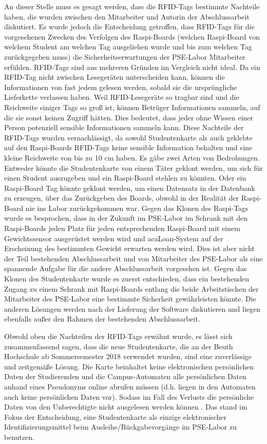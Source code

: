 An dieser Stelle muss es gesagt werden, dass die RFID-Tags bestimmte Nachteile haben, die wurden zwischen den Mitarbeiter und Autorin der Abschlussarbeit diskutiert. Es wurde jedoch die Entscheidung getroffen, dass RFID-Tags für die vorgesehenen Zwecken des Verfolgen des Raspi-Boards (welchen Raspi-Board von welchem Student am welchen Tag ausgeliehen wurde und bis zum welchen Tag zurückgegeben muss) die Sicherheitserwartungen der PSE-Labor Mitarbeiter erfühlen. RFID-Tags sind aus mehreren Gründen im Vergleich nicht ideal. Da ein RFID-Tag nicht zwischen Lesegeräten unterscheiden kann, können die Informationen von fast jedem gelesen werden, sobald sie die ursprüngliche Lieferkette verlassen haben. Weil RFID-Lesegeräte so tragbar sind und die Reichweite einiger Tags so groß ist, können Betrüger Informationen sammeln, auf die sie sonst keinen Zugriff hätten. Dies bedeutet, dass jeder ohne Wissen einer Person potenziell sensible Informationen sammeln kann. Diese Nachteile der RFID-Tags wurden vernachlässigt, da sowohl Studentenkarte als auch geklebte auf den Raspi-Boards RFID-Tags keine sensible Information behalten und eine kleine Reichweite von bis zu 10 cm haben. Es gäbe zwei Arten von Bedrohungen. Entweder könnte die Studentenkarte von einem Täter geklont werden, um sich für einen Student auszugeben und ein Raspi-Board stehlen zu könnten. Oder ein Raspi-Board Tag könnte geklont werden, um einen Datensatz in der Datenbank zu erzeugen, über das Zurückgeben des Boards, obwohl in der Realität der Raspi-Board nie ins Labor zurückgekommen war. Gegen das Klonen des Raspi-Tags wurde es besprochen, dass in der Zukunft im PSE-Labor im Schrank mit den Raspi-Boards jeden Platz für jeden entsprechenden Raspi-Board mit einem Gewichtssensor ausgerüstet werden wird und acaLoan-System auf der Erscheinung des bestimmten Gewicht erwarten werden wird. Dies ist aber nicht der Teil bestehenden Abschlussarbeit und von Mitarbeiter des PSE-Labor als eine spannende Aufgabe für die andere Abschlussarbeit vorgesehen ist. Gegen das Klonen des Studentenkarte wurde es zuerst entschieden, dass ein bestehenden Zugang zu einem Schrank mit Raspi-Boards entlang die beide Arbeitstischen der Mitarbeiter des PSE-Labor eine bestimmte Sicherheit gewährleisten könnte. Die anderen Lösungen werden nach der Lieferung der Software diskutieren und liegen ebenfalls außer den Rahmen der bestehenden Abschlussarbeit. 

Obwohl oben die Nachteilen der RFID-Tags erwähnt wurde, es lässt sich zusammenfassend sagen, dass die neue Studentenkarte, die an der Beuth Hochschule ab Sommersemester 2018 verwendet wurden, sind eine zuverlässige und zeitgemäße Lösung. Die Karte beinhaltet keine elektronischen persönlichen Daten der Studierenden und die Campus-Automaten alle persönlichen Daten anhand eines Pseudonyms online abrufen müssen (d.h. liegen in den Automaten auch keine persönlichen Daten vor). Sodass im Fall des Verlusts die persönliche Daten von den Unberechtigte nicht ausgelesen werden können \cite{website:12}. Das stand im Fokus der Entscheidung, eine Studentenkarte als einzige elektronischer Identifizierungsmittel beim Ausleihe/Rückgabevorgänge im PSE-Labor zu benutzen.

